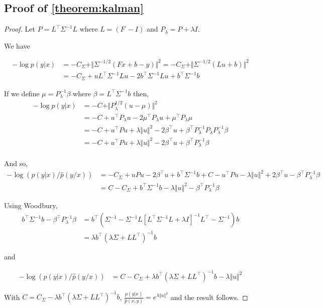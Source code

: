 \subsection{Proof of \cref{theorem:kalman}}\label{sec:proof_kalman}
\begin{proof}
Let $P = L^\top\Sigma^{-1}L$ where $L = (F ~-I)$ and $P_\lambda = P + \lambda I$.

We have

\begin{align}
    -\log p(y|x) &= -C_\Sigma + \Vert \Sigma^{-1/2}(Fx + b -y)\Vert^2 = -C_\Sigma + \Vert \Sigma^{-1/2}(Lu + b)\Vert^2\\
                 &= -C_\Sigma + uL^\top \Sigma^{-1}Lu - 2b^\top \Sigma^{-1}Lu + b^\top \Sigma^{-1}b
\end{align}

If we define $\mu = P_{\lambda}^{-1}\beta$ where $\beta = L^\top \Sigma^{-1}b$ then,
\begin{align}
    -\log p(y|x) & = -C + \Vert P_\lambda^{1/2}\left(u - \mu\right)\Vert^2\\
                 & = -C + u^\top  P_\lambda u - 2 \mu^\top  P_\lambda u + \mu^\top  P_\lambda \mu\\
                 & = -C + u^\top Pu + \lambda \Vert u \Vert^2 -2 \beta^\top u + \beta^\top P_\lambda^{-1}P_\lambda P_\lambda^{-1}\beta\\
                 & = -C + u^\top Pu + \lambda \Vert u \Vert^2 -2 \beta^\top u + \beta^\top P_\lambda^{-1}\beta\\
\end{align}

And so,
\begin{align}
    - \log(p(y|x)/\hat p(y/x)) &= -C_\Sigma + uPu - 2\beta^\top u + b^\top \Sigma^{-1}b + C - u^\top Pu - \lambda \Vert u \Vert^2 +2 \beta^\top u - \beta^\top P_\lambda^{-1}\beta\\
   &= C -C_\Sigma+ b^\top \Sigma^{-1}b - \lambda \Vert u \Vert^2 - \beta^\top P_\lambda^{-1}\beta
\end{align}

Using Woodbury,
\begin{align}
    b^\top  \Sigma^{-1}b - \beta^\top P_\lambda^{-1}\beta &= b^\top \left(\Sigma^{-1} - \Sigma^{-1}L\left[ L^\top \Sigma^{-1}L + \lambda I\right]^{-1}L^\top -\Sigma^{-1}\right)b\\
    &=\lambda b^\top \left( \lambda \Sigma + LL^\top \right)^{-1}b
\end{align}

and

\begin{align}
    - \log(p(y|x)/\hat p(y/x)) &= C -C_\Sigma + \lambda b^\top \left( \lambda \Sigma + LL^\top \right)^{-1}b- \lambda \Vert u \Vert^2
\end{align}

With $C = C_\Sigma - \lambda b^\top \left( \lambda \Sigma + LL^\top \right)^{-1}b$, $\frac{p(y|x)}{\hat p(x, y)} = e^{\lambda \Vert u \Vert^2}$ and the result follows.
\end{proof}

